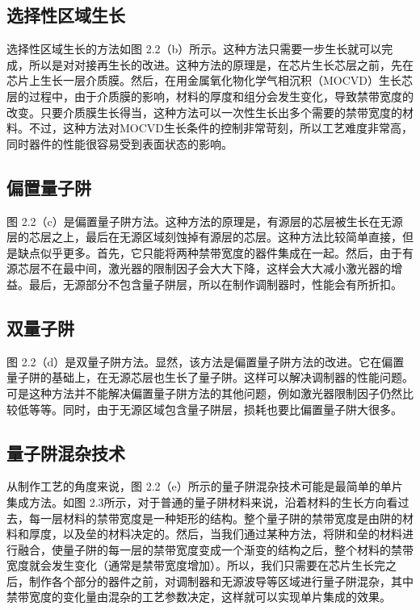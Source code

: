 \documentclass[oneside]{ZJUthesis}
\begin{document}
\subsection{选择性区域生长}

选择性区域生长的方法如图 2.2（b）所示。这种方法只需要一步生长就可以完成，所以是对对接再生长的改进。这种方法的原理是，在芯片生长芯层之前，先在芯片上生长一层介质膜。然后，在用金属氧化物化学气相沉积（MOCVD）生长芯层的过程中，由于介质膜的影响，材料的厚度和组分会发生变化，导致禁带宽度的改变。只要介质膜生长得当，这种方法可以一次性生长出多个需要的禁带宽度的材料。不过，这种方法对MOCVD生长条件的控制非常苛刻，所以工艺难度非常高，同时器件的性能很容易受到表面状态的影响。

\subsection{偏置量子阱}

图 2.2（c）是偏置量子阱方法。这种方法的原理是，有源层的芯层被生长在无源层的芯层之上，最后在无源区域刻蚀掉有源层的芯层。这种方法比较简单直接，但是缺点似乎更多。首先，它只能将两种禁带宽度的器件集成在一起。然后，由于有源芯层不在最中间，激光器的限制因子会大大下降，这样会大大减小激光器的增益。最后，无源部分不包含量子阱层，所以在制作调制器时，性能会有所折扣。

\subsection{双量子阱}

图 2.2（d）是双量子阱方法。显然，该方法是偏置量子阱方法的改进。它在偏置量子阱的基础上，在无源芯层也生长了量子阱。这样可以解决调制器的性能问题。可是这种方法并不能解决偏置量子阱方法的其他问题，例如激光器限制因子仍然比较低等等。同时，由于无源区域包含量子阱层，损耗也要比偏置量子阱大很多。

\subsection{量子阱混杂技术}

从制作工艺的角度来说，图 2.2（e）所示的量子阱混杂技术可能是最简单的单片集成方法。如图 2.3所示，对于普通的量子阱材料来说，沿着材料的生长方向看过去，每一层材料的禁带宽度是一种矩形的结构。整个量子阱的禁带宽度是由阱的材料和厚度，以及垒的材料决定的。然后，当我们通过某种方法，将阱和垒的材料进行融合，使量子阱的每一层的禁带宽度变成一个渐变的结构之后，整个材料的禁带宽度就会发生变化（通常是禁带宽度增加）。所以，我们只需要在芯片生长完之后，制作各个部分的器件之前，对调制器和无源波导等区域进行量子阱混杂，其中禁带宽度的变化量由混杂的工艺参数决定，这样就可以实现单片集成的效果。
\end{document}
